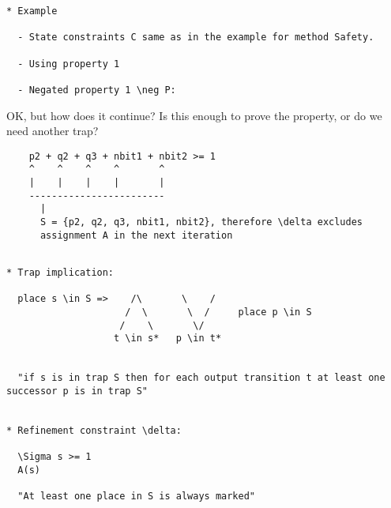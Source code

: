 \newpage

\begin{verbatim}
* Example

  - State constraints C same as in the example for method Safety.
  
  - Using property 1
  
  - Negated property 1 \neg P:
\end{verbatim}


{\Large OK, but how does it continue? Is this enough to prove the property,
or do we need another trap?}

\begin{verbatim}
    p2 + q2 + q3 + nbit1 + nbit2 >= 1
    ^    ^    ^    ^       ^
    |    |    |    |       |
    ------------------------
      |
      S = {p2, q2, q3, nbit1, nbit2}, therefore \delta excludes
      assignment A in the next iteration
\end{verbatim}

\newpage

\begin{verbatim}

* Trap implication:

  place s \in S =>    /\       \    /
                     /  \       \  /     place p \in S
                    /    \       \/
                   t \in s*   p \in t*   


  "if s is in trap S then for each output transition t at least one successor p is in trap S"


* Refinement constraint \delta:

  \Sigma s >= 1  
  A(s)

  "At least one place in S is always marked"
\end{verbatim}

